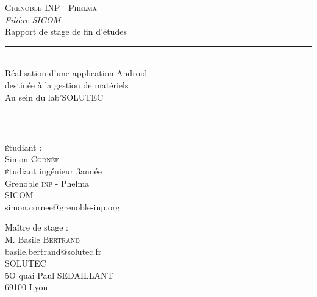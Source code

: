 \begin{titlepage}
	
	\begin{center}
	
	\textsc{\LARGE Grenoble INP - Phelma}\\
	\textsl{Filière SICOM}\\[0.1cm]
	\Large{Rapport de stage de fin d'études}\\


	\rule{\linewidth}{0.5mm}\\[0.4cm]
	{ \huge Réalisation d'une application Android\\
	destinée à la gestion de matériels\\[0.4cm] }
	{Au sein du lab'SOLUTEC}
	\rule{\linewidth}{0.5mm} \\[0.5cm]

	
	\end{center}
	

	\begin{minipage}{0.35\textwidth}
		\textsc{é}tudiant :\\
		Simon \textsc{Cornée}\\
		\textsc{é}tudiant ingénieur 3\ieme année\\
		Grenoble \textsc{inp} - Phelma\\
		SICOM\\
		simon.cornee@grenoble-inp.org
	\end{minipage}
	\begin{minipage}{0.35\textwidth}
		Maître de stage :\\
		M. Basile \textsc{Bertrand}\\
		basile.bertrand@solutec.fr\\
		\textsc{SOLUTEC}\\
		5O quai Paul SEDAILLANT\\
		69100 Lyon
	\end{minipage}




\end{titlepage}

